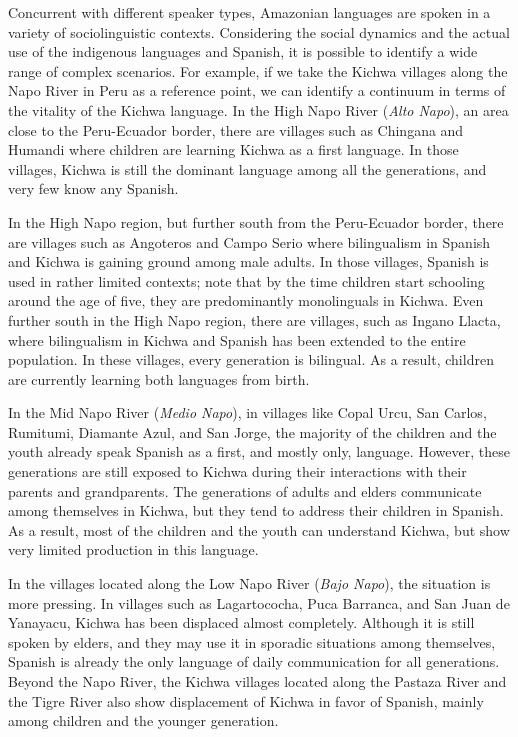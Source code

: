 \documentclass[output=paper]{langscibook}
\begin{document}
Concurrent with different speaker types, Amazonian languages are spoken in a variety of sociolinguistic contexts. Considering the social dynamics and the actual use of the indigenous languages and Spanish, it is possible to identify a wide range of complex scenarios. For example, if we take the Kichwa villages along the Napo River in Peru as a reference point, we can identify a continuum in terms of the vitality of the Kichwa language. In the High Napo River (\textit{Alto Napo}), an area close to the Peru-Ecuador border, there are villages such as Chingana and Humandi where children are learning Kichwa as a first language. In those villages, Kichwa is still the dominant language among all the generations, and very few know any Spanish.

In the High Napo region, but further south from the Peru-Ecuador border, there are villages such as Angoteros and Campo Serio where bilingualism in Spanish and Kichwa is gaining ground among male adults. In those villages, Spanish is used in rather limited contexts; note that by the time children start schooling around the age of five, they are predominantly monolinguals in Kichwa. Even further south in the High Napo region, there are villages, such as Ingano Llacta, where bilingualism in Kichwa and Spanish has been extended to the entire population. In these villages, every generation is bilingual. As a result, children are currently learning both languages from birth.

In the Mid Napo River (\textit{Medio Napo}), in villages like Copal Urcu, San Carlos, Rumitumi, Diamante Azul, and San Jorge, the majority of the children and the youth already speak Spanish as a first, and mostly only, language. However, these generations are still exposed to Kichwa during their interactions with their parents and grandparents. The generations of adults and elders communicate among themselves in Kichwa, but they tend to address their children in Spanish. As a result, most of the children and the youth can understand Kichwa, but show very limited production in this language.

In the villages located along the Low Napo River (\textit{Bajo Napo}), the situation is more pressing. In villages such as Lagartococha, Puca Barranca, and San Juan de Yanayacu, Kichwa has been displaced almost completely. Although it is still spoken by elders, and they may use it in sporadic situations among themselves, Spanish is already the only language of daily communication for all generations. Beyond the Napo River, the Kichwa villages located along the Pastaza River and the Tigre River also show displacement of Kichwa in favor of Spanish, mainly among children and the younger generation.
\end{document}
